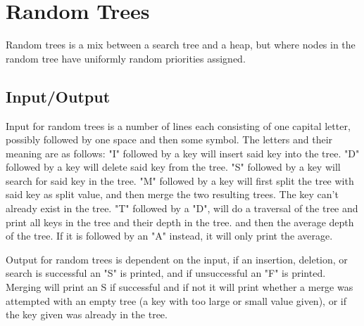 \documentclass[12pt, a4paper]{article}
\begin{document}
\section*{Random Trees}
Random trees is a mix between a search tree and a heap, but where
nodes in the random tree have uniformly random priorities assigned.

\subsection*{Input/Output}
Input for random trees is a number of lines each consisting of one capital 
letter, possibly followed by one space and then some symbol.
The letters and their meaning are as follows: 
"I" followed by a key will insert said key into the tree.
"D" followed by a key will delete said key from the tree.
"S" followed by a key will search for said key in the tree.
"M" followed by a key will first split the tree with said key as split value,
and then merge the two resulting trees. The key can't already exist in the tree.
"T" followed by a "D", will do a traversal of the 
tree and print all keys in the tree and their depth in the tree. and then 
the average depth of the tree. If it is followed by an "A" instead, it will only
print the average.

\medskip
Output for random trees is dependent on the input, if an insertion, 
deletion, or search is successful
an "S" is printed, and if unsuccessful an "F" is printed. 
Merging will print an S if successful and if not it will print whether
a merge was attempted with an empty tree (a key with too 
large or small value given), or if the key given was already
in the tree.
\end{document}
